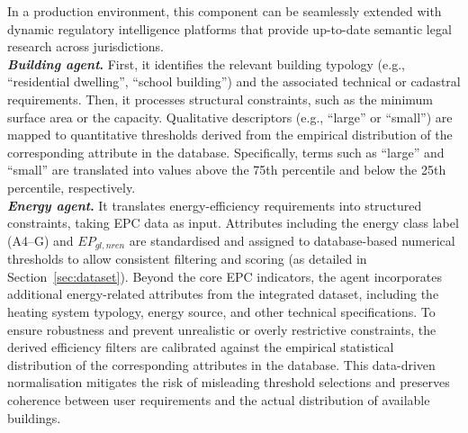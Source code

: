 \documentclass[runningheads,orivec]{llncs}
\newcommand{\energyagent}{\textit{Energy agent}}
\newcommand{\buildingagent}{\textit{Building agent}}
\begin{document}
In a production environment, this component can be seamlessly extended with dynamic regulatory intelligence platforms that provide up-to-date semantic legal research across jurisdictions.\\
\textbf{\buildingagent.} 
First, it identifies the relevant building typology (e.g., “residential dwelling”, “school building”) and the associated technical or cadastral requirements.
Then, it processes structural constraints, such as the minimum surface area or the capacity.
Qualitative descriptors (e.g., ``large'' or ``small'') are mapped to quantitative thresholds derived from the empirical distribution of the corresponding attribute in the database.
Specifically, terms such as ``large'' and ``small'' are translated into values above the 75th percentile and below the 25th percentile, respectively.\\
\textbf{\energyagent.}
It translates energy-efficiency requirements into structured constraints, taking EPC data as input.
Attributes including the energy class label (A4--G) and $EP_{gl,nren}$ are standardised and assigned to database-based numerical thresholds to allow consistent filtering and scoring (as detailed in Section~\ref{sec:dataset}).
Beyond the core EPC indicators, the agent incorporates additional energy-related attributes from the integrated dataset, including the heating system typology, energy source, and other technical specifications.
To ensure robustness and prevent unrealistic or overly restrictive constraints, the derived efficiency filters are calibrated against the empirical statistical distribution of the corresponding attributes in the database.
This data-driven normalisation mitigates the risk of misleading threshold selections and preserves coherence between user requirements and the actual distribution of available buildings.



\end{document}
